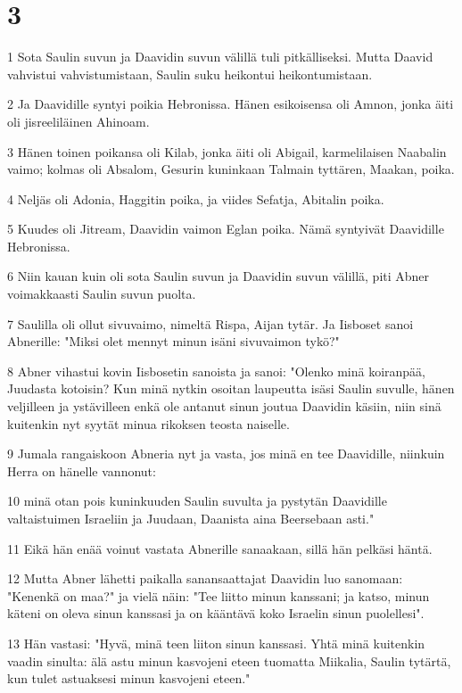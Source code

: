 \chapter{3}

\par 1 Sota Saulin suvun ja Daavidin suvun välillä tuli pitkälliseksi. Mutta Daavid vahvistui vahvistumistaan, Saulin suku heikontui heikontumistaan.
\par 2 Ja Daavidille syntyi poikia Hebronissa. Hänen esikoisensa oli Amnon, jonka äiti oli jisreeliläinen Ahinoam.
\par 3 Hänen toinen poikansa oli Kilab, jonka äiti oli Abigail, karmelilaisen Naabalin vaimo; kolmas oli Absalom, Gesurin kuninkaan Talmain tyttären, Maakan, poika.
\par 4 Neljäs oli Adonia, Haggitin poika, ja viides Sefatja, Abitalin poika.
\par 5 Kuudes oli Jitream, Daavidin vaimon Eglan poika. Nämä syntyivät Daavidille Hebronissa.
\par 6 Niin kauan kuin oli sota Saulin suvun ja Daavidin suvun välillä, piti Abner voimakkaasti Saulin suvun puolta.
\par 7 Saulilla oli ollut sivuvaimo, nimeltä Rispa, Aijan tytär. Ja Iisboset sanoi Abnerille: "Miksi olet mennyt minun isäni sivuvaimon tykö?"
\par 8 Abner vihastui kovin Iisbosetin sanoista ja sanoi: "Olenko minä koiranpää, Juudasta kotoisin? Kun minä nytkin osoitan laupeutta isäsi Saulin suvulle, hänen veljilleen ja ystävilleen enkä ole antanut sinun joutua Daavidin käsiin, niin sinä kuitenkin nyt syytät minua rikoksen teosta naiselle.
\par 9 Jumala rangaiskoon Abneria nyt ja vasta, jos minä en tee Daavidille, niinkuin Herra on hänelle vannonut:
\par 10 minä otan pois kuninkuuden Saulin suvulta ja pystytän Daavidille valtaistuimen Israeliin ja Juudaan, Daanista aina Beersebaan asti."
\par 11 Eikä hän enää voinut vastata Abnerille sanaakaan, sillä hän pelkäsi häntä.
\par 12 Mutta Abner lähetti paikalla sanansaattajat Daavidin luo sanomaan: "Kenenkä on maa?" ja vielä näin: "Tee liitto minun kanssani; ja katso, minun käteni on oleva sinun kanssasi ja on kääntävä koko Israelin sinun puolellesi".
\par 13 Hän vastasi: "Hyvä, minä teen liiton sinun kanssasi. Yhtä minä kuitenkin vaadin sinulta: älä astu minun kasvojeni eteen tuomatta Miikalia, Saulin tytärtä, kun tulet astuaksesi minun kasvojeni eteen."
